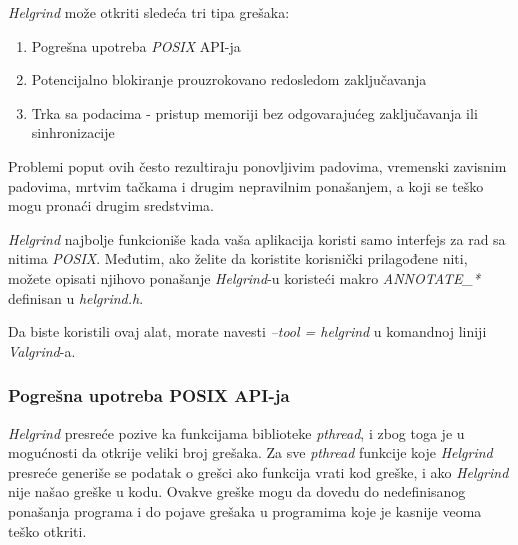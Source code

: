 \documentclass[12pt,oneside]{memoir}
\theoremstyle{plain}
\theoremstyle{definition}
\begin{document}
\textit{Helgrind} može otkriti sledeća tri tipa grešaka:
\begin{enumerate}
	\item Pogrešna upotreba \textit{POSIX} API-ja
	\item Potencijalno blokiranje prouzrokovano redosledom zaključavanja
	\item Trka sa podacima - pristup memoriji bez odgovarajućeg zaključavanja ili sinhronizacije
\end{enumerate}

Problemi poput ovih često rezultiraju ponovljivim padovima, vremenski zavisnim padovima, mrtvim tačkama i drugim nepravilnim ponašanjem, a koji se teško mogu pronaći drugim sredstvima.

\textit{Helgrind} najbolje funkcioniše kada vaša aplikacija koristi samo interfejs za rad sa nitima \textit{POSIX}. Međutim, ako želite da koristite korisnički prilagođene niti, možete opisati njihovo ponašanje \textit{Helgrind}-u koristeći makro \textit{ANNOTATE\_*} definisan u \textit{helgrind.h}.

Da biste koristili ovaj alat, morate navesti \textit{--tool = helgrind} u komandnoj liniji \textit{Valgrind}-a.

\subsubsection{Pogrešna upotreba POSIX API-ja}
\textit{Helgrind} presreće pozive ka funkcijama biblioteke \textit{pthread}, i zbog toga je u mogućnosti da otkrije veliki broj grešaka. Za sve \textit{pthread} funkcije koje \textit{Helgrind} presreće generiše se podatak o grešci ako funkcija vrati kod greške, i ako \textit{Helgrind} nije našao greške u kodu. Ovakve greške mogu da dovedu do nedefinisanog ponašanja programa i do pojave grešaka u programima koje je kasnije veoma teško otkriti.
\end{document}
